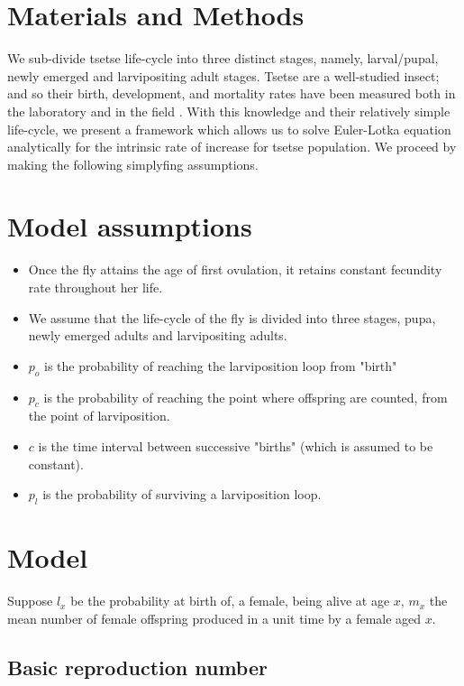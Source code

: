 \documentclass[10pt,a4paper]{article}
\begin{document}
\section*{Materials and Methods}
We sub-divide tsetse life-cycle into three distinct stages, namely, larval/pupal, newly emerged and larvipositing adult stages. Tsetse are a well-studied insect; and so their birth, development, and mortality rates have been measured both  in  the laboratory and  in the field \cite{Rogers2011,Hargrove2004a,Jarry2007,Hargrove2011,Hargrove2019a}. With this knowledge and their relatively simple life-cycle, we present a framework which allows us to solve Euler-Lotka equation analytically for the intrinsic rate of increase for tsetse population. We proceed by making the following simplyfing  assumptions.   
\section*{Model assumptions} 
\begin{itemize} 
	\item  Once the fly attains the age of first ovulation, it retains constant fecundity rate throughout her life.   
	\item We assume that the life-cycle of the fly is divided into three stages, pupa, newly emerged adults and larvipositing adults. 
		\item  $p_o$ is the probability of reaching the larviposition loop from "birth"
	\item   $p_c$ is the probability of reaching the point where offspring are counted, from the point of larviposition.
	\item   $c$ is the time interval between successive "births" (which is assumed to be constant). 
	\item   $p_l$ is the probability of surviving a larviposition loop.
\end{itemize}


\section*{Model} 

Suppose  $l_{x}$ be the probability at birth of, a female, being alive at age $x$, $m_{x}$ the mean number of female offspring produced in a unit time by a female aged $x$.  




\subsection*{Basic reproduction number}
\end{document}

